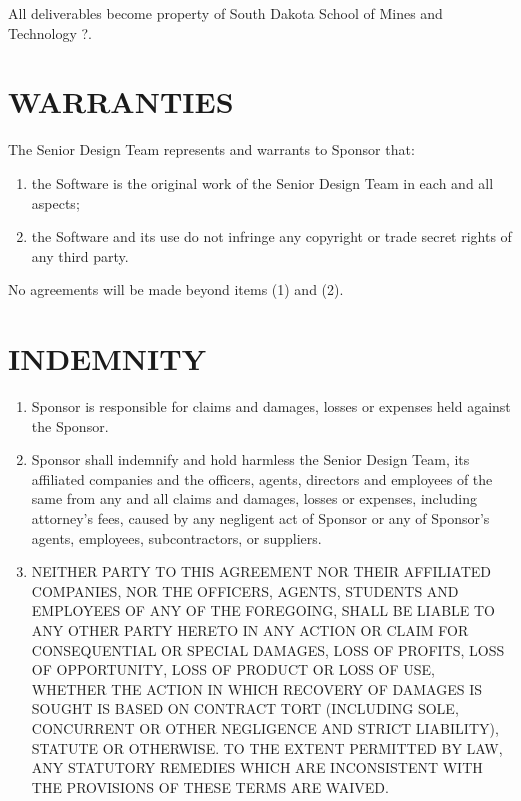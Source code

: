 \documentclass[11pt]{article}
\begin{document}
All deliverables become property of South Dakota School of Mines and Technology ?.

\section{WARRANTIES }  

The Senior Design Team represents and warrants to Sponsor that:         
\begin{enumerate}  \itemsep4pt \parskip0pt 
\item  the Software is the original work of the Senior Design Team in each and all aspects;        

\item the Software and its use do not infringe any copyright or   trade secret rights of any third party.  
\end{enumerate}
No agreements will be made beyond items (1) and (2).

\section{INDEMNITY}   
\begin{enumerate}  \itemsep4pt \parskip0pt 
\item Sponsor is responsible for claims and damages, losses or expenses held against the Sponsor. 

\item  Sponsor shall       indemnify and hold harmless the Senior Design Team, its affiliated companies       and the officers, agents, directors and employees of the same from       any and all claims and damages, losses or expenses, including       attorney's fees, caused by any negligent act of Sponsor or any of       Sponsor's agents, employees, subcontractors, or suppliers.    

\item  NEITHER PARTY TO THIS AGREEMENT NOR THEIR AFFILIATED COMPANIES,       NOR THE OFFICERS, AGENTS, STUDENTS AND EMPLOYEES OF ANY OF THE       FOREGOING, SHALL BE LIABLE TO ANY OTHER PARTY HERETO IN ANY ACTION       OR CLAIM FOR CONSEQUENTIAL OR SPECIAL DAMAGES, LOSS OF PROFITS,       LOSS OF OPPORTUNITY, LOSS OF PRODUCT OR LOSS OF USE, WHETHER THE       ACTION IN WHICH RECOVERY OF DAMAGES IS SOUGHT IS BASED ON CONTRACT       TORT (INCLUDING SOLE, CONCURRENT OR OTHER NEGLIGENCE AND STRICT       LIABILITY), STATUTE OR OTHERWISE. TO THE EXTENT PERMITTED BY LAW,       ANY STATUTORY REMEDIES WHICH ARE INCONSISTENT WITH THE PROVISIONS       OF THESE TERMS ARE WAIVED.  
\end{enumerate}
\end{document}
